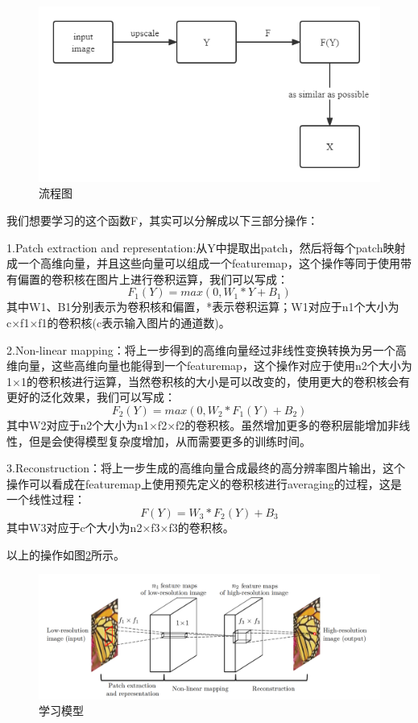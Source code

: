 \documentclass[UTF8,a4paper,10pt]{ctexrep}
\begin{document}
\begin{figure}[H]
  \centering
  \includegraphics[scale=0.5]{figure/p1.png}
  \caption{流程图}
  \label{fig:p1}
\end{figure}

我们想要学习的这个函数F，其实可以分解成以下三部分操作：


1.Patch extraction and representation:从Y中提取出patch，然后将每个patch映射成一个高维向量，并且这些向量可以组成一个featuremap，这个操作等同于使用带有偏置的卷积核在图片上进行卷积运算，我们可以写成：
$$F_1(Y)=max(0,W_1\ast Y+B_1)$$
其中W1、B1分别表示为卷积核和偏置，*表示卷积运算；W1对应于n1个大小为c×f1×f1的卷积核(c表示输入图片的通道数)。

2.Non-linear mapping：将上一步得到的高维向量经过非线性变换转换为另一个高维向量，这些高维向量也能得到一个featuremap，这个操作对应于使用n2个大小为1×1的卷积核进行运算，当然卷积核的大小是可以改变的，使用更大的卷积核会有更好的泛化效果，我们可以写成：
$$F_2(Y)=max(0,W_2\ast F_1(Y)+B_2)$$
其中W2对应于n2个大小为n1×f2×f2的卷积核。虽然增加更多的卷积层能增加非线性，但是会使得模型复杂度增加，从而需要更多的训练时间。

3.Reconstruction：将上一步生成的高维向量合成最终的高分辨率图片输出，这个操作可以看成在featuremap上使用预先定义的卷积核进行averaging的过程，这是一个线性过程：
$$F(Y)=W_3\ast F_2(Y)+B_3$$
其中W3对应于c个大小为n2×f3×f3的卷积核。

以上的操作如图\ref{fig:p2}所示。

\begin{figure}[H]
  \centering
  \includegraphics[scale=0.8]{figure/p2.png}
  \caption{学习模型}
  \label{fig:p2}
\end{figure}
\end{document}
